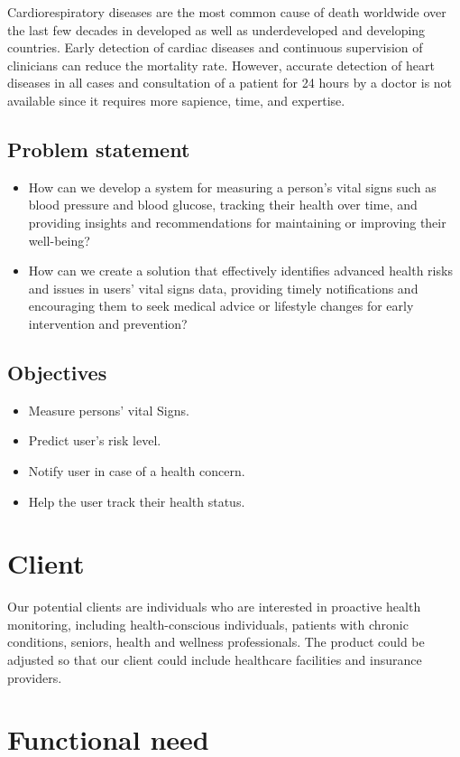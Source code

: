\documentclass[12pt]{article}
\begin{document}
Cardiorespiratory diseases are the most common cause of death worldwide over the last few decades in developed as well as underdeveloped and developing countries. Early detection of cardiac diseases and continuous supervision of clinicians can reduce the mortality rate. However, accurate detection of heart diseases in all cases and consultation of a patient for 24 hours by a doctor is not available since it requires more sapience, time, and expertise.

\subsection{Problem statement}
\begin{itemize}
    \item How can we develop a system for measuring a person's vital signs such as blood pressure and blood glucose, tracking their health over time, and providing insights and recommendations for maintaining or improving their well-being?
    \item How can we create a solution that effectively identifies advanced health risks and issues in users' vital signs data, providing timely notifications and encouraging them to seek medical advice or lifestyle changes for early intervention and prevention?
\end{itemize}

\subsection{Objectives}
\begin{itemize}
    \item Measure persons' vital Signs.
    \item Predict user's risk level.
    \item Notify user in case of a health concern.
    \item Help the user track their health status.
\end{itemize}
\newpage
\section{Client}
Our potential clients are individuals who are interested in proactive health monitoring, including health-conscious individuals, patients with chronic conditions, seniors, health and wellness professionals. The product could be adjusted so that our client could include healthcare facilities and insurance providers.

\section{Functional need}
\end{document}
